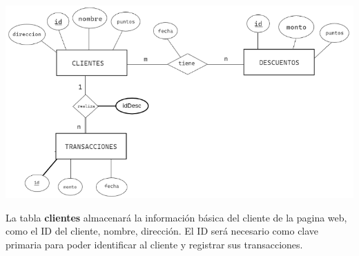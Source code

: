 \documentclass{article}
\begin{document}
\vspace{0.5cm}

\begin{logo}
    \includegraphics[width=.99\textwidth]{img/db.png}
\end{logo}

La tabla \textbf{clientes} almacenará la información básica del cliente de la pagina web, como el ID del cliente, nombre, dirección. El ID será necesario como clave primaria para poder identificar al cliente y registrar sus transacciones.\\


\clearpage
\end{document}
